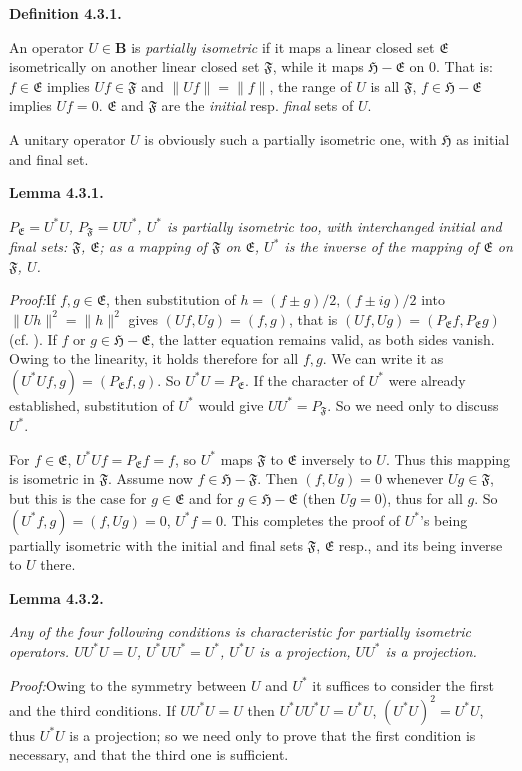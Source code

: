 \documentclass[12pt,b5paper,twoside]{article}
\newcommand{\Hspace}{\mathfrak H}
\newcommand{\B}{\mathbf B}
\newcommand{\Definition}[1]{%
  \par\smallskip\noindent\phantomsection\label{def:#1}\textbf{Definition #1.}\enspace
}
\newcommand{\Lemma}[1]{%
  \par\smallskip\noindent\phantomsection\label{lem:#1}\textbf{Lemma #1.}\enspace
}
\newcommand{\Proof}{\par\noindent\textit{Proof:}\enspace}
\begin{document}
\Definition{4.3.1}
An operator $U\in\B$ is \emph{partially isometric} if it maps a linear closed
set $\mathfrak E$ isometrically on another linear closed set $\mathfrak F$,
while it maps $\Hspace-\mathfrak E$ on $0$. That is: $f\in\mathfrak E$
implies $Uf\in\mathfrak F$ and $\lVert Uf\rVert=\lVert f\rVert$, the range of
$U$ is all $\mathfrak F$, $f\in\Hspace-\mathfrak E$ implies $Uf=0$.
$\mathfrak E$ and $\mathfrak F$ are the \emph{initial} resp. \emph{final} sets
of $U$.

A unitary operator $U$ is obviously such a partially isometric one, with
$\Hspace$ as initial and final set.

\Lemma{4.3.1}
\emph{$P_{\mathfrak E}=U^*U$, $P_{\mathfrak F}=UU^*$, $U^*$ is partially
isometric too, with interchanged initial and final sets: $\mathfrak F$,
$\mathfrak E$; as a mapping of $\mathfrak F$ on $\mathfrak E$, $U^*$ is the
inverse of the mapping of $\mathfrak E$ on $\mathfrak F$, $U$.}

\Proof If $f,g\in\mathfrak E$, then substitution of
$h=(f\pm g)/2,(f\pm ig)/2$ into $\lVert Uh\rVert^2=\lVert h\rVert^2$
gives $(Uf,Ug)=(f,g)$, that is
$(Uf,Ug)=(P_{\mathfrak E}f,P_{\mathfrak E}g)$
(cf. \cite[p.~71]{ref16}). If $f$ or $g\in\Hspace-\mathfrak E$, the latter
equation remains valid, as both sides vanish. Owing to the linearity, it holds
therefore for all $f,g$. We can write it as
$(U^*Uf,g)=(P_{\mathfrak E}f,g)$. So $U^*U=P_{\mathfrak E}$. If the
character of $U^*$ were already established, substitution of $U^*$ would give
$UU^*=P_{\mathfrak F}$. So we need only to discuss $U^*$.

For $f\in\mathfrak E$, $U^*Uf=P_{\mathfrak E}f=f$, so $U^*$ maps
$\mathfrak F$ to $\mathfrak E$ inversely to $U$. Thus this mapping is
isometric in $\mathfrak F$. Assume now $f\in\Hspace-\mathfrak F$. Then
$(f,Ug)=0$ whenever $Ug\in\mathfrak F$, but this is the case for
$g\in\mathfrak E$ and for $g\in\Hspace-\mathfrak E$ (then $Ug=0$), thus for
all $g$. So $(U^*f,g)=(f,Ug)=0$, $U^*f=0$. This completes the proof of
$U^*$'s being partially isometric with the initial and final sets
$\mathfrak F$, $\mathfrak E$ resp., and its being inverse to $U$ there.

\Lemma{4.3.2}
\emph{Any of the four following conditions is characteristic for partially
isometric operators. $UU^*U=U$, $U^*UU^*=U^*$, $U^*U$ is a projection,
$UU^*$ is a projection.}

\Proof Owing to the symmetry between $U$ and $U^*$ it suffices to consider
the first and the third conditions. If $UU^*U=U$ then
$U^*UU^*U=U^*U$, $(U^*U)^2=U^*U$, thus $U^*U$ is a projection; so we need
only to prove that the first condition is necessary, and that the third one is
sufficient.
\end{document}
